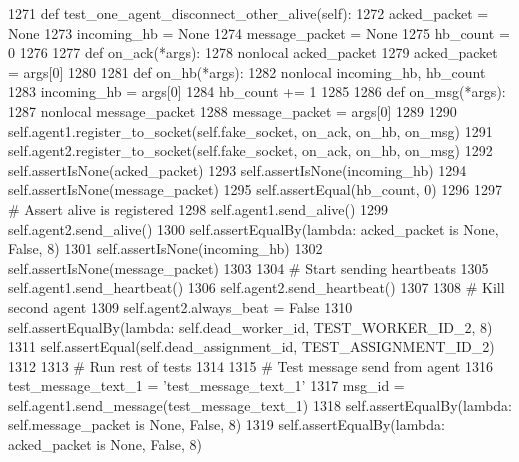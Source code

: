 \begin{DoxyCode}
1271     \textcolor{keyword}{def }test\_one\_agent\_disconnect\_other\_alive(self):
1272         acked\_packet = \textcolor{keywordtype}{None}
1273         incoming\_hb = \textcolor{keywordtype}{None}
1274         message\_packet = \textcolor{keywordtype}{None}
1275         hb\_count = 0
1276 
1277         \textcolor{keyword}{def }on\_ack(*args):
1278             nonlocal acked\_packet
1279             acked\_packet = args[0]
1280 
1281         \textcolor{keyword}{def }on\_hb(*args):
1282             nonlocal incoming\_hb, hb\_count
1283             incoming\_hb = args[0]
1284             hb\_count += 1
1285 
1286         \textcolor{keyword}{def }on\_msg(*args):
1287             nonlocal message\_packet
1288             message\_packet = args[0]
1289 
1290         self.agent1.register\_to\_socket(self.fake\_socket, on\_ack, on\_hb, on\_msg)
1291         self.agent2.register\_to\_socket(self.fake\_socket, on\_ack, on\_hb, on\_msg)
1292         self.assertIsNone(acked\_packet)
1293         self.assertIsNone(incoming\_hb)
1294         self.assertIsNone(message\_packet)
1295         self.assertEqual(hb\_count, 0)
1296 
1297         \textcolor{comment}{# Assert alive is registered}
1298         self.agent1.send\_alive()
1299         self.agent2.send\_alive()
1300         self.assertEqualBy(\textcolor{keyword}{lambda}: acked\_packet \textcolor{keywordflow}{is} \textcolor{keywordtype}{None}, \textcolor{keyword}{False}, 8)
1301         self.assertIsNone(incoming\_hb)
1302         self.assertIsNone(message\_packet)
1303 
1304         \textcolor{comment}{# Start sending heartbeats}
1305         self.agent1.send\_heartbeat()
1306         self.agent2.send\_heartbeat()
1307 
1308         \textcolor{comment}{# Kill second agent}
1309         self.agent2.always\_beat = \textcolor{keyword}{False}
1310         self.assertEqualBy(\textcolor{keyword}{lambda}: self.dead\_worker\_id, TEST\_WORKER\_ID\_2, 8)
1311         self.assertEqual(self.dead\_assignment\_id, TEST\_ASSIGNMENT\_ID\_2)
1312 
1313         \textcolor{comment}{# Run rest of tests}
1314 
1315         \textcolor{comment}{# Test message send from agent}
1316         test\_message\_text\_1 = \textcolor{stringliteral}{'test\_message\_text\_1'}
1317         msg\_id = self.agent1.send\_message(test\_message\_text\_1)
1318         self.assertEqualBy(\textcolor{keyword}{lambda}: self.message\_packet \textcolor{keywordflow}{is} \textcolor{keywordtype}{None}, \textcolor{keyword}{False}, 8)
1319         self.assertEqualBy(\textcolor{keyword}{lambda}: acked\_packet \textcolor{keywordflow}{is} \textcolor{keywordtype}{None}, \textcolor{keyword}{False}, 8)

\end{DoxyCode}
